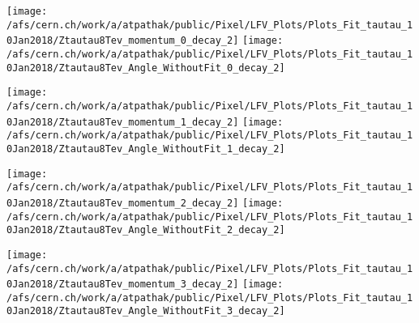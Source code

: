 \documentclass{beamer}
\begin{document}
\begin{frame}
\begin{normalsize}
\begin{center}
\texttt{[image: /afs/cern.ch/work/a/atpathak/public/Pixel/LFV\_Plots/Plots\_Fit\_tautau\_10Jan2018/Ztautau8Tev\_momentum\_0\_decay\_2]}
\texttt{[image: /afs/cern.ch/work/a/atpathak/public/Pixel/LFV\_Plots/Plots\_Fit\_tautau\_10Jan2018/Ztautau8Tev\_Angle\_WithoutFit\_0\_decay\_2]} 
\end{center}
\end{normalsize}
\end {frame}
\begin{frame}
\begin{normalsize}
\begin{center}
\texttt{[image: /afs/cern.ch/work/a/atpathak/public/Pixel/LFV\_Plots/Plots\_Fit\_tautau\_10Jan2018/Ztautau8Tev\_momentum\_1\_decay\_2]}
\texttt{[image: /afs/cern.ch/work/a/atpathak/public/Pixel/LFV\_Plots/Plots\_Fit\_tautau\_10Jan2018/Ztautau8Tev\_Angle\_WithoutFit\_1\_decay\_2]} 
\end{center}
\end{normalsize}
\end {frame}
\begin{frame}
\begin{normalsize}
\begin{center}
\texttt{[image: /afs/cern.ch/work/a/atpathak/public/Pixel/LFV\_Plots/Plots\_Fit\_tautau\_10Jan2018/Ztautau8Tev\_momentum\_2\_decay\_2]}
\texttt{[image: /afs/cern.ch/work/a/atpathak/public/Pixel/LFV\_Plots/Plots\_Fit\_tautau\_10Jan2018/Ztautau8Tev\_Angle\_WithoutFit\_2\_decay\_2]} 
\end{center}
\end{normalsize}
\end {frame}
\begin{frame}
\begin{normalsize}
\begin{center}
\texttt{[image: /afs/cern.ch/work/a/atpathak/public/Pixel/LFV\_Plots/Plots\_Fit\_tautau\_10Jan2018/Ztautau8Tev\_momentum\_3\_decay\_2]}
\texttt{[image: /afs/cern.ch/work/a/atpathak/public/Pixel/LFV\_Plots/Plots\_Fit\_tautau\_10Jan2018/Ztautau8Tev\_Angle\_WithoutFit\_3\_decay\_2]} 
\end{center}
\end{normalsize}
\end {frame}
\end{document}
